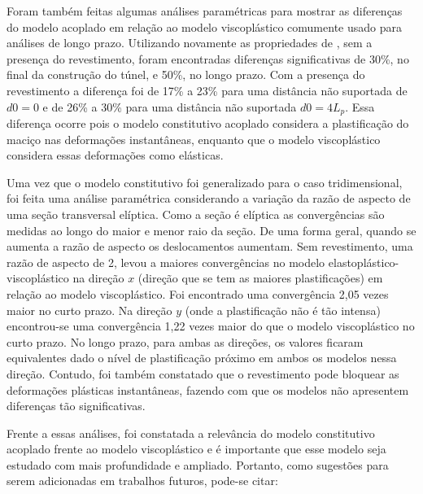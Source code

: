 Foram também feitas algumas análises paramétricas para mostrar as diferenças do modelo acoplado em relação ao modelo viscoplástico comumente usado para análises de longo prazo. Utilizando novamente as propriedades de , sem a presença do revestimento, foram encontradas diferenças significativas de 30\%, no final da construção do túnel, e 50\%, no longo prazo. Com a presença do revestimento a diferença foi de 17\% a 23\% para uma distância não suportada de $d0=0$ e de 26\% a 30\% para uma distância não suportada $d0=4L_p$. Essa diferença ocorre pois o modelo constitutivo acoplado considera a plastificação do maciço nas deformações instantâneas, enquanto que o modelo viscoplástico considera essas deformações como elásticas.

Uma vez que o modelo constitutivo foi generalizado para o caso tridimensional, foi feita uma análise paramétrica considerando a variação da razão de aspecto de uma seção transversal elíptica. Como a seção é elíptica as convergências são medidas ao longo do maior e menor raio da seção. De uma forma geral, quando se aumenta a razão de aspecto os deslocamentos aumentam. Sem revestimento, uma razão de aspecto de 2, levou a maiores convergências no modelo elastoplástico-viscoplástico na direção $x$ (direção que se tem as maiores plastificações) em relação ao modelo viscoplástico. Foi encontrado uma convergência 2,05 vezes maior no curto prazo. Na direção $y$ (onde a plastificação não é tão intensa) encontrou-se uma convergência 1,22 vezes maior do que o modelo viscoplástico no curto prazo. No longo prazo, para ambas as direções, os valores ficaram equivalentes dado o nível de plastificação próximo em ambos os modelos nessa direção. Contudo, foi também constatado que o revestimento pode bloquear as deformações plásticas instantâneas, fazendo com que os modelos não apresentem diferenças tão significativas.

Frente a essas análises, foi constatada a relevância do modelo constitutivo acoplado frente ao modelo viscoplástico e é importante que esse modelo seja estudado com mais profundidade e ampliado. Portanto, como sugestões para serem adicionadas em trabalhos futuros, pode-se citar:

